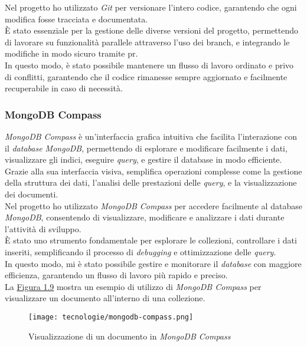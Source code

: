\noindent Nel progetto ho utilizzato \textit{Git} per versionare l'intero codice, garantendo che ogni modifica fosse tracciata e documentata. \\
È stato essenziale per la gestione delle diverse versioni del progetto, permettendo di lavorare su funzionalità parallele attraverso l'uso dei \gls{branch}, e integrando le modifiche in modo sicuro tramite \gls{pr}. \\
In questo modo, è stato possibile mantenere un flusso di lavoro ordinato e privo di conflitti, garantendo che il codice rimanesse sempre aggiornato e facilmente recuperabile in caso di necessità. 

\subsubsection{MongoDB Compass}

\textit{MongoDB Compass} è un'interfaccia grafica intuitiva che facilita l'interazione con il \textit{database MongoDB}, permettendo di esplorare e modificare facilmente i dati, visualizzare gli indici, eseguire \textit{query}, e gestire il database in modo efficiente.\\
Grazie alla sua interfaccia visiva, semplifica operazioni complesse come la gestione della struttura dei dati, l'analisi delle prestazioni delle \textit{query}, e la visualizzazione dei documenti.\\

\noindent Nel progetto ho utilizzato \textit{MongoDB Compass}  per accedere facilmente al database \textit{MongoDB}, consentendo di visualizzare, modificare e analizzare i dati durante l'attività di sviluppo.\\
È stato uno strumento fondamentale per esplorare le collezioni, controllare i dati inseriti, semplificando il processo di \textit{debugging} e ottimizzazione delle \textit{query}.\\
In questo modo, mi è stato possibile gestire e monitorare il \textit{database} con maggiore efficienza, garantendo un flusso di lavoro più rapido e preciso.\\

\noindent La {\hyperref[fig:mongodb-compass]{Figura 1.9}} mostra un esempio di utilizzo di \textit{MongoDB Compass} per visualizzare un documento all'interno di una collezione.

\begin{figure}[H]
    \label{fig:mongodb-compass}
    \centering
    \texttt{[image: tecnologie/mongodb-compass.png]}
    \caption{Visualizzazione di un documento in \textit{MongoDB Compass}}
\end{figure}
